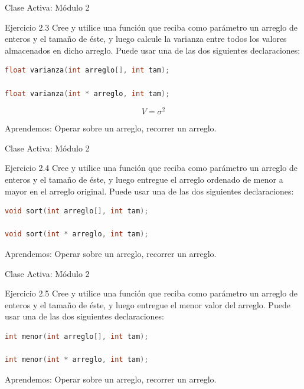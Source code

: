 \documentclass{beamer}
\begin{document}
\begin{frame}[fragile]{Clase Activa: Módulo 2}
\begin{exampleblock}{Ejercicio 2.3}
Cree y utilice una función que reciba como parámetro un arreglo de enteros y el tamaño de éste, y luego calcule la varianza entre todos los valores almacenados en dicho arreglo. Puede usar una de las dos siguientes declaraciones:
\begin{lstlisting}[language=C, basicstyle=\scriptsize]
float varianza(int arreglo[], int tam);

float varianza(int * arreglo, int tam);
\end{lstlisting}

$$ V = \sigma^2 $$
\end{exampleblock}

{\tiny Aprendemos: Operar sobre un arreglo, recorrer un arreglo.}
\end{frame}

\begin{frame}[fragile]{Clase Activa: Módulo 2}
\begin{exampleblock}{Ejercicio 2.4}
Cree y utilice una función que reciba como parámetro un arreglo de enteros y el tamaño de éste, y luego entregue el arreglo ordenado de menor a mayor en el arreglo original. Puede usar una de las dos siguientes declaraciones:
\begin{lstlisting}[language=C, basicstyle=\scriptsize]
void sort(int arreglo[], int tam);

void sort(int * arreglo, int tam);
\end{lstlisting}
\end{exampleblock}

{\tiny Aprendemos: Operar sobre un arreglo, recorrer un arreglo.}
\end{frame}

\begin{frame}[fragile]{Clase Activa: Módulo 2}
\begin{exampleblock}{Ejercicio 2.5}
Cree y utilice una función que reciba como parámetro un arreglo de enteros y el tamaño de éste, y luego entregue el menor valor del arreglo. Puede usar una de las dos siguientes declaraciones:
\begin{lstlisting}[language=C, basicstyle=\scriptsize]
int menor(int arreglo[], int tam);

int menor(int * arreglo, int tam);
\end{lstlisting}
\end{exampleblock}

{\tiny Aprendemos: Operar sobre un arreglo, recorrer un arreglo.}
\end{frame}
\end{document}
